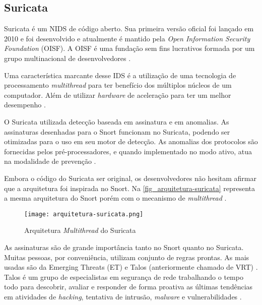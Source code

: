 \subsection{Suricata} \label{sec:suricata}

Suricata é um NIDS de código aberto. Sua primeira versão oficial foi lançado em 2010 e foi desenvolvido e atualmente é mantido pela \textit{Open Information Security Foundation} (OISF). A OISF é uma fundação sem fins lucrativos formada por um grupo multinacional de desenvolvedores \cite{suricata}.

Uma característica marcante desse IDS é a utilização de uma tecnologia de processamento \textit{multithread} para ter benefício dos múltiplos núcleos de um computador. Além de utilizar \textit{hardware} de aceleração para ter um melhor desempenho \cite{arquitetura:martin}.

O Suricata utilizada detecção baseada em assinatura e em anomalias. As assinaturas desenhadas para o Snort funcionam no Suricata, podendo ser otimizadas para o uso em seu motor de detecção. As anomalias dos protocolos são fornecidas pelos pré-processadores, e quando implementado no modo ativo, atua na modalidade de prevenção \cite{arquitetura:martin}.

Embora o código do Suricata ser original, os desenvolvedores não hesitam afirmar que a arquitetura foi inspirada no Snort. Na \autoref{fig_arquitetura-suricata} representa a mesma arquitetura do Snort porém com o mecanismo de \textit{multithread} \cite{arquitetura:martin}. 


\begin{figure}[!htb]
  \centering
  \caption{Arquitetura \textit{Multithread} do Suricata} \label{fig_arquitetura-suricata}
  \texttt{[image: arquitetura-suricata.png]} 
\end{figure}

As assinaturas são de grande importância tanto no Snort quanto no Suricata. Muitas pessoas, por conveniência, utilizam conjunto de regras prontas. As mais usadas são da Emerging Threats (ET) e Talos (anteriormente chamado de VRT) \cite{suricata:rule}. Talos é um grupo de especialistas em segurança de rede trabalhando o tempo todo para descobrir, avaliar e responder de forma proativa as últimas tendências em atividades de \textit{hacking}, tentativa de intrusão, \textit{malware} e vulnerabilidades \cite{snort:talos}. 

